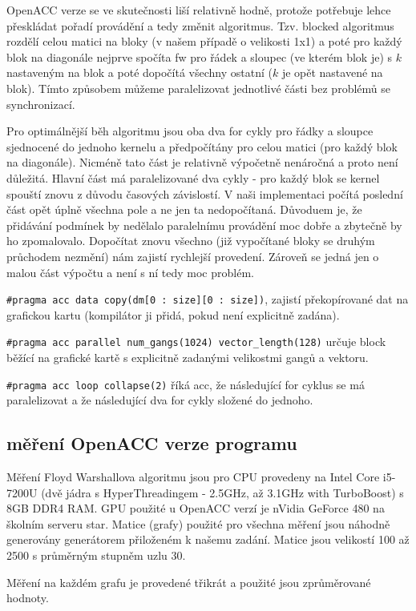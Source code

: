 \documentclass[11pt, fleqn]{article}
\begin{document}
OpenACC verze se ve skutečnosti liší relativně hodně, protože potřebuje lehce přeskládat pořadí provádění a tedy změnit algoritmus. Tzv. blocked algoritmus rozdělí celou matici na bloky (v našem případě o velikosti 1x1) a poté pro každý blok na diagonále nejprve spočíta fw pro řádek a sloupec (ve kterém blok je) s $k$ nastaveným na blok a poté dopočítá všechny ostatní ($k$ je opět nastavené na blok). Tímto způsobem můžeme paralelizovat jednotlivé části bez problémů se synchronizací.

Pro optimálnější běh algoritmu jsou oba dva for cykly pro řádky a sloupce sjednocené do jednoho kernelu a předpočítány pro celou matici (pro každý blok na diagonále). Nicméně tato část je relativně výpočetně nenáročná a proto není důležitá. Hlavní část má paralelizované dva cykly - pro každý blok se kernel spouští znovu z důvodu časových závislostí. V naši implementaci počítá poslední část opět úplně všechna pole a ne jen ta nedopočítaná. Důvoduem je, že přidávání podmínek by nedělalo paralelnímu provádění moc dobře a zbytečně by ho zpomalovalo. Dopočítat znovu všechno (již vypočítané bloky se druhým průchodem nezmění) nám zajistí rychlejší provedení. Zároveň se jedná jen o malou část výpočtu a není s ní tedy moc problém.

\lstinline{#pragma acc data copy(dm[0 : size][0 : size])}, zajistí překopírované dat na grafickou kartu (kompilátor ji přidá, pokud není explicitně zadána).

\lstinline{#pragma acc parallel num_gangs(1024) vector_length(128)} určuje block běžící na grafické kartě s explicitně zadanými velikostmi gangů a vektoru.

\lstinline{#pragma acc loop collapse(2)} říká acc, že následující for cyklus se má paralelizovat a že následující dva for cykly složené do jednoho.


\subsection{měření OpenACC verze programu}

Měření Floyd Warshallova algoritmu jsou pro CPU provedeny na Intel Core i5-7200U (dvě jádra s HyperThreadingem - 2.5GHz, až 3.1GHz with TurboBoost) s 8GB DDR4 RAM. GPU použité u OpenACC verzí je nVidia GeForce 480 na školním serveru star. Matice (grafy) použité pro všechna měření jsou náhodně generovány generátorem přiloženém k našemu zadání. Matice jsou velikostí 100 až 2500 s průměrným stupněm uzlu 30.

Měření na každém grafu je provedené třikrát a použité jsou zprůměrované hodnoty.
\end{document}
